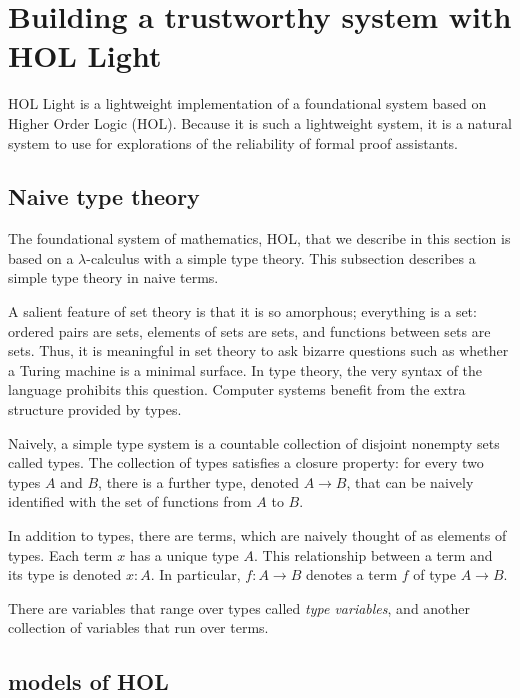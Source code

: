 \documentclass[brochure,english,12pt]{bourbaki}
\theoremstyle{plain}
\def\op#1{{\operatorname{#1}}}
\begin{document}
\section{Building a trustworthy system with HOL Light}

\def\bool{\op{bool}}
\def\Fun{\op{Fun}}

HOL Light is a lightweight implementation of a foundational system
based on Higher Order Logic (HOL).  Because it is such a lightweight system,
it is a natural system to use for explorations of the reliability of formal proof assistants.



\subsection{Naive type theory}



The foundational system of mathematics, HOL, that we describe in this section is based
on a $\lambda$-calculus with a simple type theory.  This subsection describes a simple type theory in
naive terms.  

A salient feature of set theory is that it is so amorphous; everything is a set:
ordered pairs are sets, elements of sets are sets,
and functions between sets are sets.
Thus, it is meaningful in set theory to ask bizarre questions such as whether 
a Turing machine is a minimal surface.  In type theory,
the very syntax of the language prohibits this question.  Computer systems benefit from
the extra structure provided by types.

Naively, a simple type system is a countable collection of disjoint nonempty sets called types.
The collection of types satisfies a closure property: for every two types $A$ and $B$,
there  is a further type, denoted $A\to B$, that can be naively identified with the set of functions from
$A$ to $B$.  

In addition to types, there are terms, which are naively thought of as elements of types.
Each term $x$ has a unique type $A$.  This relationship between a term and its type is denoted $x:A$.
In particular, $f:A\to B$ denotes a term $f$ of type $A\to B$.

There are variables that range over types called {\it type variables}, and another
collection of variables that run over terms.


\subsection{models of HOL}
\end{document}
